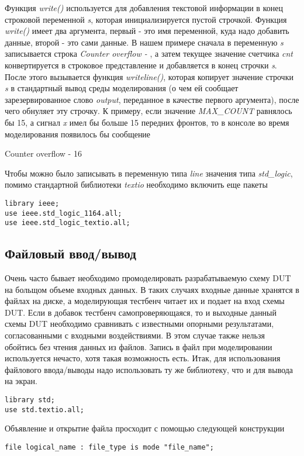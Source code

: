 Функция \emph{write()} используется для добавления текстовой информации в конец строковой переменной \emph{s}, которая инициализируется пустой строчкой. Функция \emph{write()} имеет два аргумента, первый - это имя переменной, куда надо добавить данные, второй - это сами данные. В нашем примере сначала в переменную \emph{s} записывается строка \emph{Counter overflow - }, а затем текущее значение счетчика \emph{cnt} конвертируется в строковое представление и добавляется в конец строчки \emph{s}. После этого вызывается функция \emph{writeline()}, которая копирует значение строчки \emph{s} в стандартный вывод среды моделирования (о чем ей сообщает зарезервированное слово \emph{output}, переданное в качестве первого аргумента), после чего обнуляет эту строчку. К примеру, если значение \emph{MAX\_COUNT} равнялось бы 15, а сигнал \emph{x} имел бы больше 15 передних фронтов, то в консоле во время моделирования появилось бы сообщение

Counter overflow - 16

Чтобы можно было записывать в переменную типа \emph{line} значения типа \emph{std\_logic}, помимо стандартной библиотеки \emph{textio} необходимо включить еще пакеты
\begin{lstlisting}
library ieee;
use ieee.std_logic_1164.all;
use ieee.std_logic_textio.all;
\end{lstlisting}

\subsection{Файловый ввод/вывод}

Очень часто бывает необходимо промоделировать разрабатываемую схему DUT на больщом объеме входных данных. В таких случаях входные данные хранятся в файлах на диске, а моделирующая тестбенч читает их и подает на вход схемы DUT. Если в добавок тестбенч самопроверяющаяся, то и выходные данный схемы DUT необходимо сравнивать с известными опорными результатами, согласованными с входными воздействиями. В этом случае также нельзя обойтись без чтения данных из файлов. Запись в файл при моделировании используется нечасто, хотя такая возможность есть. Итак, для использования файлового ввода/выводы надо использовать ту же библиотеку, что и для вывода на экран.

\begin{lstlisting}
library std;
use std.textio.all;
\end{lstlisting}

Объявление и открытие файла просходит с помощью следующей конструкции
\begin{lstlisting}
file logical_name : file_type is mode "file_name";
\end{lstlisting}

